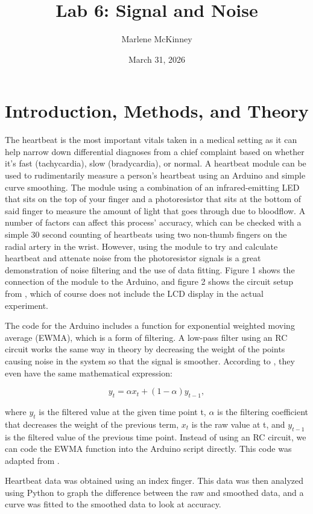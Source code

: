 \documentclass{article}
\title{Lab 6: Signal and Noise}
\author{Marlene McKinney}
\date{March 31, 2026}
\begin{document}
\maketitle
\section{Introduction, Methods, and Theory}
The heartbeat is the most important vitals taken in a medical setting as it can help narrow down differential diagnoses from a chief complaint based on whether it's fast (tachycardia), slow (bradycardia), or normal. A heartbeat module can be used to rudimentarily measure a person's heartbeat using an Arduino and simple curve smoothing. The module using a combination of an infrared-emitting LED that sits on the top of your finger and a photoresistor that sits at the bottom of said finger to measure the amount of light that goes through due to bloodflow. A number of factors can affect this process' accuracy, which can be checked with a simple 30 second counting of heartbeats using two non-thumb fingers on the radial artery in the wrist. However, using the module to try and calculate heartbeat and attenate noise from the photoresistor signals is a great demonstration of noise filtering and the use of data fitting. Figure 1 shows the connection of the module to the Arduino, and figure 2 shows the circuit setup from \cite{heartbeat}, which of course does not include the LCD display in the actual experiment. 

The code for the Arduino includes a function for exponential weighted moving average (EWMA), which is a form of filtering. A low-pass filter using an RC circuit works the same way in theory by decreasing the weight of the points causing noise in the system so that the signal is smoother. According to \cite{lowpass}, they even have the same mathematical expression: 

\[y_t = \alpha{x_t} + (1 - \alpha)y_{t-1},\]

where $y_t$ is the filtered value at the given time point t, $\alpha$ is the filtering coefficient that decreases the weight of the previous term, $x_t$ is the raw value at t, and $y_{t-1}$ is the filtered value of the previous time point. Instead of using an RC circuit, we can code the EWMA function into the Arduino script directly. This code was adapted from \cite{ewma}.

Heartbeat data was obtained using an index finger. This data was then analyzed using Python to graph the difference between the raw and smoothed data, and a curve was fitted to the smoothed data to look at accuracy.
\end{document}
